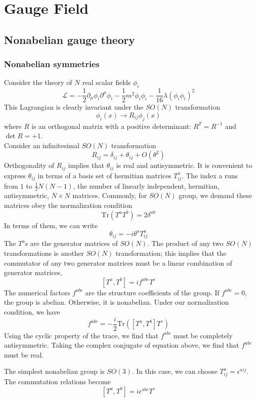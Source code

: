 \documentclass[cyan]{elegantnote}
\author{Yuyang Songsheng}
\begin{document}
\maketitle
\tableofcontents
\chapter{Gauge Field}
\section{Nonabelian gauge theory}
\subsection{Nonabelian symmetries}
Consider the theory of $N$ real scalar fields $\phi_i$
\[\mathcal{L} = -\frac{1}{2}\partial_{\mu}\phi_i \partial^{\mu}\phi_i - \frac{1}{2}m^2\phi_i\phi_i - \frac{1}{16}\lambda(\phi_i\phi_i)^2\]
This Lagrangian is clearly invariant under the $SO(N)$ transformation
\[\phi_i(x) \to R_{ij}\phi_j(x)\]
where $R$ is an orthogonal matrix with a positive determinant: $R^T = R^{-1}$ and $\det R = +1$.
\\
Consider an infinitesimal $SO(N)$ transformation
\[R_{ij} = \delta_{ij} + \theta_{ij} + O(\theta^2)\]
Orthogonality of $R_{ij}$ implies that $\theta_{ij}$ is real and antisymmetric. It is convenient to express $\theta_{ij}$ in terms of a basis set of hermitian matrices $T^a_{ij}$. The index a runs from $1$ to $\frac{1}{2}N(N-1)$, the number of linearly independent, hermitian, antisymmetric, $N \times N$ matrices. Commonly, for $SO(N)$ group, we demand these matrices obey the normalization condition
\[\mathrm{Tr}(T^a T^b) = 2\delta^{ab}\]
In terms of them, we can write
\[\theta_{ij} = -i\theta^a T^a_{ij}\]
The $T^a$s are the generator matrices of $SO(N)$. The product of any two $SO(N)$ transformations is another $SO(N)$ transformation; this implies that the commutator of any two generator matrices must be a linear combination of generator matrices,
\[[T^a,T^b] = if^{abc}T^c\]
The numerical factors $f^{abc}$ are the structure coefficients of the group. If $f^{abc} = 0$, the group is abelian. Otherwise, it is nonabelian. Under our normalization condition, we have
\[f^{abc} = -\frac{i}{2} \mathrm{Tr} \left([T^a,T^b]T^c \right)\]
Using the cyclic property of the trace, we find that $f^{abc}$ must be completely antisymmetric. Taking the complex conjugate of equation above, we find that $f^{abc}$ must be real.

\begin{example}
The simplest nonabelian group is $SO(3)$. In this case, we can choose $T^a_{ij} = \epsilon^{aij}$. The commutation relations become
\[[T^a,T^b] = i\epsilon^{abc}T^c\]
\end{example}
\end{document}
